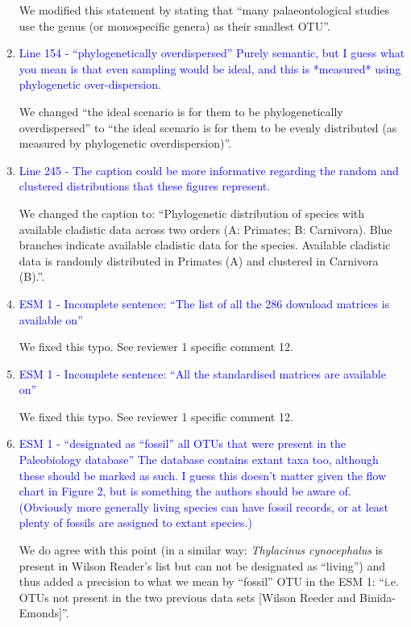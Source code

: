 \documentclass[12pt,letterpaper]{article}
\begin{document}
\begin{enumerate}
We modified this statement by stating that ``many palaeontological studies use the genus (or monospecific genera) as their smallest OTU''.

\item{\textcolor{blue}{Line 154 - ``phylogenetically overdispersed'' Purely semantic, but I guess what you mean is that even sampling would be ideal, and this is *measured* using phylogenetic over-dispersion.}}

We changed ``the ideal scenario is for them to be phylogenetically overdispersed'' to ``the ideal scenario is for them to be evenly distributed (as measured by phylogenetic overdispersion)''.

\item{\textcolor{blue}{Line 245 - The caption could be more informative regarding the random and clustered distributions that these figures represent.}}

We changed the caption to: ``Phylogenetic distribution of species with available cladistic data across two orders (A: Primates; B: Carnivora). Blue branches indicate available cladistic data for the species. Available cladistic data is randomly distributed in Primates (A) and clustered in Carnivora (B).''.

\item{\textcolor{blue}{ESM 1 - Incomplete sentence: ``The list of all the 286 download matrices is available on''}}

We fixed this typo. See reviewer 1 specific comment 12.

\item{\textcolor{blue}{ESM 1 - Incomplete sentence: ``All the standardised matrices are available on''}}

We fixed this typo. See reviewer 1 specific comment 12.

\item{\textcolor{blue}{ESM 1 - ``designated as ``fossil'' all OTUs that were present in the Paleobiology database'' The database contains extant taxa too, although these should be marked as such. I guess this doesn't matter given the flow chart in Figure 2, but is something the authors should be aware of. (Obviously more generally living species can have fossil records, or at least plenty of fossils are assigned to extant species.)}}

We do agree with this point (in a similar way: \textit{Thylacinus cynocephalus} is present in Wilson Reader's list but can not be designated as ``living'') and thus added a precision to what we mean by ``fossil'' OTU in the ESM 1: ``i.e. OTUs not present in the two previous data sets [Wilson Reeder and Binida-Emonds]''.


\end{enumerate}
\end{document}
